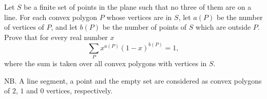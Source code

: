 Let $S$ be a finite set of points in the plane such that no three of them are on a line. For each convex polygon $P$ whose vertices are in $S$, let $a(P)$ be the number of vertices of $P$, and let $b(P)$ be the number of points of $S$ which are outside $P$. Prove that for every real number $x$
\[
\sum_P x^{a(P)} (1 - x)^{b(P)} = 1,
\]
where the sum is taken over all convex polygons with vertices in $S$.

\medskip

\noindent NB. A line segment, a point and the empty set are considered as convex polygons of $2$, $1$ and $0$ vertices, respectively.
